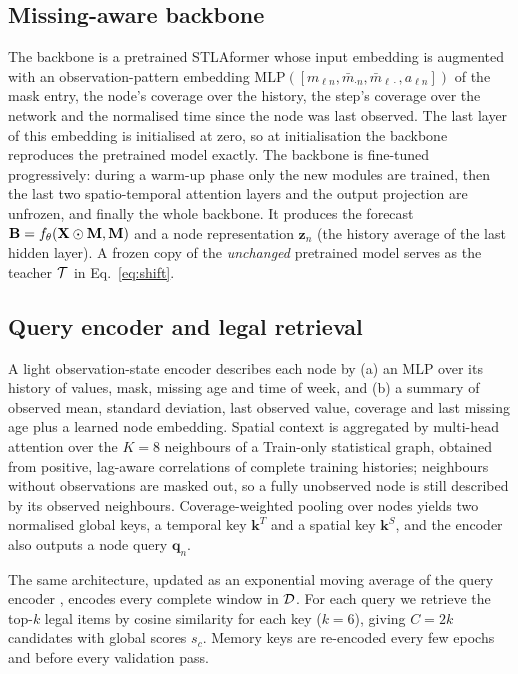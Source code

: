 \subsection{Missing-aware backbone}
\label{sec:backbone}
The backbone is a pretrained STLAformer \citep{stlaformer} whose input embedding is augmented with an observation-pattern embedding $\mathrm{MLP}([m_{\ell n},\bar m_{\cdot n},\bar m_{\ell\cdot},a_{\ell n}])$ of the mask entry, the node's coverage over the history, the step's coverage over the network and the normalised time since the node was last observed. The last layer of this embedding is initialised at zero, so at initialisation the backbone reproduces the pretrained model exactly. The backbone is fine-tuned progressively: during a warm-up phase only the new modules are trained, then the last two spatio-temporal attention layers and the output projection are unfrozen, and finally the whole backbone. It produces the forecast $\mathbf{B}=f_\theta(\mathbf{X}\odot\mathbf{M},\mathbf{M})$ and a node representation $\mathbf{z}_n$ (the history average of the last hidden layer). A frozen copy of the \emph{unchanged} pretrained model serves as the teacher $\mathcal{T}$ in Eq.~\eqref{eq:shift}.

\subsection{Query encoder and legal retrieval}
\label{sec:retrieval}
A light observation-state encoder describes each node by (a) an MLP over its history of values, mask, missing age and time of week, and (b) a summary of observed mean, standard deviation, last observed value, coverage and last missing age plus a learned node embedding. Spatial context is aggregated by multi-head attention over the $K=8$ neighbours of a Train-only statistical graph, obtained from positive, lag-aware correlations of complete training histories; neighbours without observations are masked out, so a fully unobserved node is still described by its observed neighbours. Coverage-weighted pooling over nodes yields two normalised global keys, a temporal key $\mathbf{k}^T$ and a spatial key $\mathbf{k}^S$, and the encoder also outputs a node query $\mathbf{q}_n$.

The same architecture, updated as an exponential moving average of the query encoder \citep{he2020moco}, encodes every complete window in $\mathcal{D}$. For each query we retrieve the top-$k$ legal items by cosine similarity for each key ($k=6$), giving $C=2k$ candidates with global scores $s_c$. Memory keys are re-encoded every few epochs and before every validation pass.

